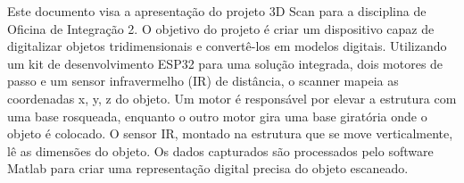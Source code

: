 
\begin{resumoutfpr}%
Este documento visa a apresentação do projeto 3D Scan para a disciplina de Oficina de Integração 2. O objetivo do projeto é criar um dispositivo capaz de digitalizar objetos tridimensionais e convertê-los em modelos digitais. Utilizando um kit de desenvolvimento ESP32 para uma solução integrada, dois motores de passo e um sensor infravermelho (IR) de distância, o scanner mapeia as coordenadas x, y, z do objeto. Um motor é responsável por elevar a estrutura com uma base rosqueada, enquanto o outro motor gira uma base giratória onde o objeto é colocado. O sensor IR, montado na estrutura que se move verticalmente, lê as dimensões do objeto. Os dados capturados são processados pelo software Matlab  para criar uma representação digital precisa do objeto escaneado.
\end{resumoutfpr}
